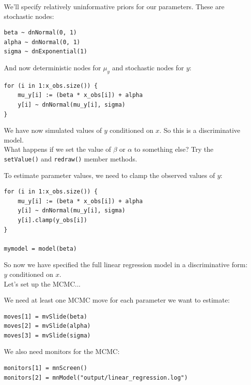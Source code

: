 \documentclass[mathserif]{beamer}
\begin{document}
\begin{frame}[fragile]
    We'll specify relatively uninformative priors for our parameters. These are stochastic nodes:\\
    \bigskip
    \begin{lstlisting}
beta ~ dnNormal(0, 1)
alpha ~ dnNormal(0, 1)
sigma ~ dnExponential(1)
    \end{lstlisting}
\end{frame}


\begin{frame}[fragile]
And now deterministic nodes for $\mu_y$ and stochastic nodes for $y$:\\
    \bigskip
    \begin{lstlisting}
for (i in 1:x_obs.size()) {
    mu_y[i] := (beta * x_obs[i]) + alpha
    y[i] ~ dnNormal(mu_y[i], sigma)
}
    \end{lstlisting}
\bigskip
    We have now simulated values of $y$ conditioned on $x$. 
    So this is a \alert{discriminative} model.  \\
\bigskip
What happens if we set the value of $\beta$ or $\alpha$ to something else?
    Try the \texttt{setValue()} and \texttt{redraw()} member methods.
\end{frame}


\begin{frame}[fragile]
To estimate parameter values, we need to \alert{clamp}
the observed values of $y$:
    \bigskip
    \begin{lstlisting}
for (i in 1:x_obs.size()) {
    mu_y[i] := (beta * x_obs[i]) + alpha
    y[i] ~ dnNormal(mu_y[i], sigma)
    y[i].clamp(y_obs[i])
}

mymodel = model(beta)
    \end{lstlisting}
\bigskip
    So now we have specified the full linear regression model in a \alert{discriminative} form: $y$ conditioned on $x$.  \\
\bigskip
Let's set up the MCMC...
\end{frame}


\begin{frame}[fragile]
We need at least one MCMC move for each parameter we want to estimate:
    \bigskip
    \begin{lstlisting}
moves[1] = mvSlide(beta)
moves[2] = mvSlide(alpha)
moves[3] = mvSlide(sigma)
    \end{lstlisting}
\bigskip
We also need monitors for the MCMC:
    \bigskip
    \begin{lstlisting}
monitors[1] = mnScreen()
monitors[2] = mnModel("output/linear_regression.log")
    \end{lstlisting}
\end{frame}
\end{document}
